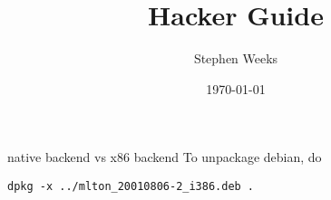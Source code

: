 \documentclass[12pt,openany]{report}
\title{{\mlton} Hacker Guide}
\author{Stephen Weeks}
\date{\today}
\begin{document}
\maketitle

\tableofcontents



native backend vs x86 backend
To unpackage debian, do
\begin{verbatim}
dpkg -x ../mlton_20010806-2_i386.deb .
\end{verbatim}
\printindex


\end{document}
